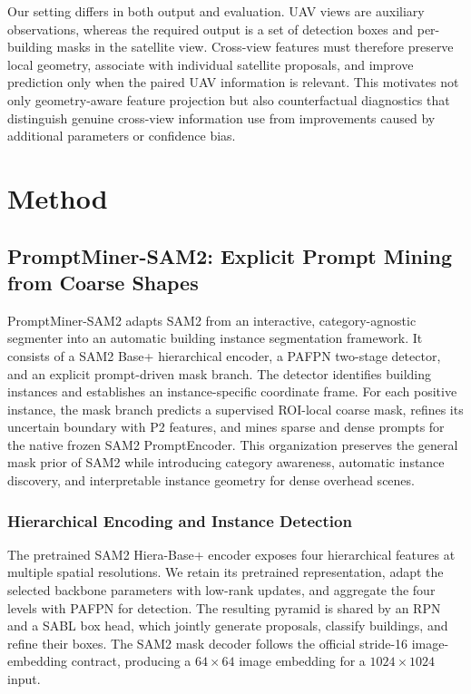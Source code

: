 \documentclass[letterpaper,journal]{IEEEtran}
\begin{document}
Our setting differs in both output and evaluation. UAV views are auxiliary observations, whereas the required output is a set of detection boxes and per-building masks in the satellite view. Cross-view features must therefore preserve local geometry, associate with individual satellite proposals, and improve prediction only when the paired UAV information is relevant. This motivates not only geometry-aware feature projection but also counterfactual diagnostics that distinguish genuine cross-view information use from improvements caused by additional parameters or confidence bias.

\section{Method}
\label{sec:method}

\subsection{PromptMiner-SAM2: Explicit Prompt Mining from Coarse Shapes}
\label{sec:single_method}

PromptMiner-SAM2 adapts SAM2 from an interactive, category-agnostic segmenter into an automatic building instance segmentation framework. It consists of a SAM2 Base+ hierarchical encoder, a PAFPN two-stage detector, and an explicit prompt-driven mask branch. The detector identifies building instances and establishes an instance-specific coordinate frame. For each positive instance, the mask branch predicts a supervised ROI-local coarse mask, refines its uncertain boundary with P2 features, and mines sparse and dense prompts for the native frozen SAM2 PromptEncoder. This organization preserves the general mask prior of SAM2 while introducing category awareness, automatic instance discovery, and interpretable instance geometry for dense overhead scenes.

\subsubsection{Hierarchical Encoding and Instance Detection}
The pretrained SAM2 Hiera-Base+ encoder exposes four hierarchical features at multiple spatial resolutions. We retain its pretrained representation, adapt the selected backbone parameters with low-rank updates, and aggregate the four levels with PAFPN for detection. The resulting pyramid is shared by an RPN and a SABL box head, which jointly generate proposals, classify buildings, and refine their boxes. The SAM2 mask decoder follows the official stride-16 image-embedding contract, producing a $64\times64$ image embedding for a $1024\times1024$ input.
\end{document}
